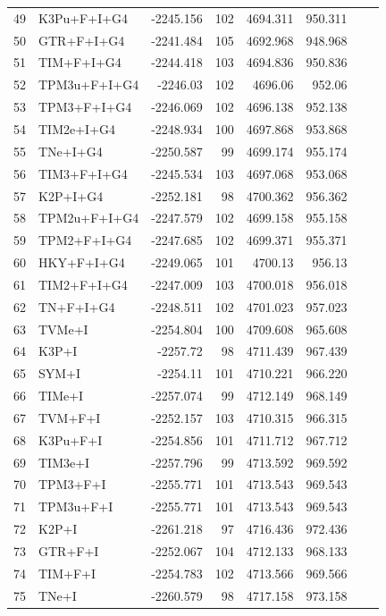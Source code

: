 \documentclass[12pt]{article}
\begin{document}
\begin{longtable}{clrrrrrr}
	49 & K3Pu+F+I+G4 & -2245.156 & 102 & 4694.311 & 950.311 \\ 
	50 & GTR+F+I+G4 & -2241.484 & 105 & 4692.968 & 948.968 \\ 
	51 & TIM+F+I+G4 & -2244.418 & 103 & 4694.836 & 950.836 \\ 
	52 & TPM3u+F+I+G4 & -2246.03 & 102 & 4696.06 & 952.06 \\ 
	53 & TPM3+F+I+G4 & -2246.069 & 102 & 4696.138 & 952.138 \\ 
	54 & TIM2e+I+G4 & -2248.934 & 100 & 4697.868 & 953.868 \\ 
	55 & TNe+I+G4 & -2250.587 & 99 & 4699.174 & 955.174 \\ 
	56 & TIM3+F+I+G4 & -2245.534 & 103 & 4697.068 & 953.068 \\ 
	57 & K2P+I+G4 & -2252.181 & 98 & 4700.362 & 956.362 \\ 
	58 & TPM2u+F+I+G4 & -2247.579 & 102 & 4699.158 & 955.158 \\ 
	59 & TPM2+F+I+G4 & -2247.685 & 102 & 4699.371 & 955.371 \\ 
	60 & HKY+F+I+G4 & -2249.065 & 101 & 4700.13 & 956.13 \\ 
	61 & TIM2+F+I+G4 & -2247.009 & 103 & 4700.018 & 956.018 \\ 
	62 & TN+F+I+G4 & -2248.511 & 102 & 4701.023 & 957.023 \\ 
	63 & TVMe+I & -2254.804 & 100 & 4709.608 & 965.608 \\ 
	64 & K3P+I & -2257.72 & 98 & 4711.439 & 967.439 \\ 
	65 & SYM+I & -2254.11 & 101 & 4710.221 & 966.220 \\ 
	66 & TIMe+I & -2257.074 & 99 & 4712.149 & 968.149 \\ 
	67 & TVM+F+I & -2252.157 & 103 & 4710.315 & 966.315 \\ 
	68 & K3Pu+F+I & -2254.856 & 101 & 4711.712 & 967.712 \\ 
	69 & TIM3e+I & -2257.796 & 99 & 4713.592 & 969.592 \\ 
	70 & TPM3+F+I & -2255.771 & 101 & 4713.543 & 969.543 \\ 
	71 & TPM3u+F+I & -2255.771 & 101 & 4713.543 & 969.543 \\ 
	72 & K2P+I & -2261.218 & 97 & 4716.436 & 972.436 \\ 
	73 & GTR+F+I & -2252.067 & 104 & 4712.133 & 968.133 \\ 
	74 & TIM+F+I & -2254.783 & 102 & 4713.566 & 969.566 \\ 
	75 & TNe+I & -2260.579 & 98 & 4717.158 & 973.158 \\ 

\end{longtable}
\end{document}

